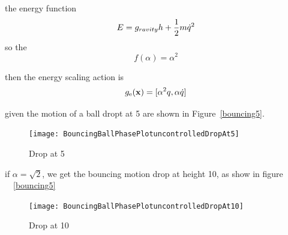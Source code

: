the energy function 
\[
E=g_{ravity}h+\frac{1}{2}m\dot{q}^2
\]
so the 
\[
f(\alpha)=\alpha^2
\]

then the energy scaling action is
\[
g_{\mathrm{e}}(\mathbf{x})=[\alpha^2 q, \alpha \dot{q}]
\]

given the motion of a ball dropt at 5 are shown in Figure~\ref{bouncing5}.


\begin{figure}[!htbp]
  \begin{center}
      \texttt{[image: BouncingBallPhasePlotuncontrolledDropAt5]}
    \caption{Drop at 5}
    \label{fig:bouncing5}
\end{center}
\end{figure}

if $\alpha=\sqrt{2}$, we get the bouncing motion drop at height 10, as show in figure ~~\ref{bouncing5}
\begin{figure}[!htbp]
  \begin{center}
      \texttt{[image: BouncingBallPhasePlotuncontrolledDropAt10]}
    \caption{Drop at 10}
    \label{fig:bouncing10}
\end{center}
\end{figure}


